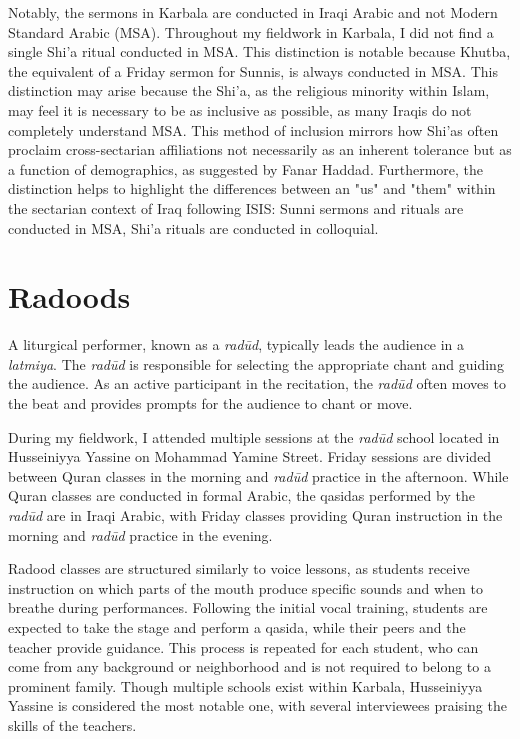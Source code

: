 Notably, the sermons in Karbala are conducted in Iraqi Arabic and not Modern Standard Arabic (MSA). Throughout my fieldwork in Karbala, I did not find a single Shi'a ritual conducted in MSA. This distinction is notable because Khutba, the equivalent of a Friday sermon for Sunnis, is always conducted in MSA. This distinction may arise because the Shi'a, as the religious minority within Islam, may feel it is necessary to be as inclusive as possible, as many Iraqis do not completely understand MSA. This method of inclusion mirrors how Shi'as often proclaim cross-sectarian affiliations not necessarily as an inherent tolerance but as a function of demographics, as suggested by Fanar Haddad\cite[183]{haddad_understanding_2020}. Furthermore, the distinction helps to highlight the differences between an "us" and "them" within the sectarian context of Iraq following ISIS: Sunni sermons and rituals are conducted in MSA, Shi'a rituals are conducted in colloquial.

\section{Radoods}
A liturgical performer, known as a \emph{radūd}, typically leads the audience in a \emph{latmiya}. The \emph{radūd} is responsible for selecting the appropriate chant and guiding the audience. As an active participant in the recitation, the \emph{radūd} often moves to the beat and provides prompts for the audience to chant or move.

During my fieldwork, I attended multiple sessions at the \emph{radūd} school located in Husseiniyya Yassine on Mohammad Yamine Street. Friday sessions are divided between Qur{\arahamza}an classes in the morning and \emph{radūd} practice in the afternoon. While Qur{\arahamza}an classes are conducted in formal Arabic, the qasidas performed by the \emph{radūd} are in Iraqi Arabic, with Friday classes providing Qur{\arahamza}an instruction in the morning and \emph{radūd} practice in the evening.

Radood classes are structured similarly to voice lessons, as students receive instruction on which parts of the mouth produce specific sounds and when to breathe during performances. Following the initial vocal training, students are expected to take the stage and perform a qasida, while their peers and the teacher provide guidance. This process is repeated for each student, who can come from any background or neighborhood and is not required to belong to a prominent family. Though multiple schools exist within Karbala, Husseiniyya Yassine is considered the most notable one, with several interviewees praising the skills of the teachers.

